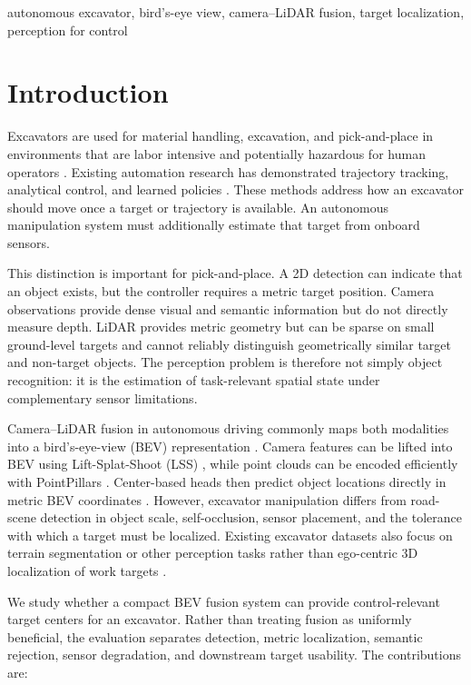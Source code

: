 \documentclass[conference]{IEEEtran}
\begin{document}
\begin{IEEEkeywords}
autonomous excavator, bird's-eye view, camera--LiDAR fusion, target localization, perception for control
\end{IEEEkeywords}

\section{Introduction}

Excavators are used for material handling, excavation, and pick-and-place in environments that are labor intensive and potentially hazardous for human operators \cite{xu2025construction,ataka2024icitee}. Existing automation research has demonstrated trajectory tracking, analytical control, and learned policies \cite{feng2018pid,jud2019trenching,egli2020iros,ataka2023icitee}. These methods address how an excavator should move once a target or trajectory is available. An autonomous manipulation system must additionally estimate that target from onboard sensors.

This distinction is important for pick-and-place. A 2D detection can indicate that an object exists, but the controller requires a metric target position. Camera observations provide dense visual and semantic information but do not directly measure depth. LiDAR provides metric geometry but can be sparse on small ground-level targets and cannot reliably distinguish geometrically similar target and non-target objects. The perception problem is therefore not simply object recognition: it is the estimation of task-relevant spatial state under complementary sensor limitations.

Camera--LiDAR fusion in autonomous driving commonly maps both modalities into a bird's-eye-view (BEV) representation \cite{liu2023bevfusion,liang2022bevfusion}. Camera features can be lifted into BEV using Lift-Splat-Shoot (LSS) \cite{philion2020lss}, while point clouds can be encoded efficiently with PointPillars \cite{lang2019pointpillars}. Center-based heads then predict object locations directly in metric BEV coordinates \cite{yin2021centerpoint}. However, excavator manipulation differs from road-scene detection in object scale, self-occlusion, sensor placement, and the tolerance with which a target must be localized. Existing excavator datasets also focus on terrain segmentation or other perception tasks rather than ego-centric 3D localization of work targets \cite{gooseex2024,agfusion2025}.

We study whether a compact BEV fusion system can provide control-relevant target centers for an excavator. Rather than treating fusion as uniformly beneficial, the evaluation separates detection, metric localization, semantic rejection, sensor degradation, and downstream target usability. The contributions are:
\end{document}

